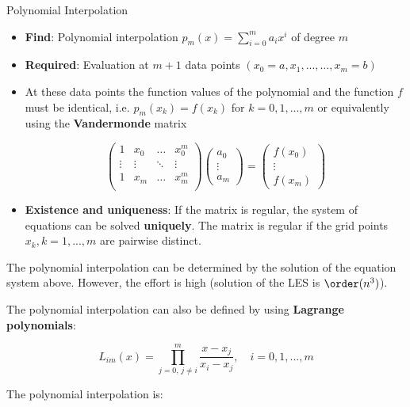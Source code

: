 \documentclass[11pt,compress,t,notes=noshow, xcolor=table]{beamer}
\begin{document}
\begin{vbframe}{Polynomial Interpolation}

\begin{itemize}
\item \textbf{Find}: Polynomial interpolation $p_m(x) = \sum_{i = 0}^m a_i x^i$ of degree $m$
\item \textbf{Required}: Evaluation at $m + 1$ data points $(x_{0} = a, x_1, ..., \ldots, x_{m} = b)$
\item At these data points the function values of the polynomial and the function $f$ must be identical, i.e. $p_m(x_k) = f(x_k)$ for $k = 0, 1, ..., m$ or equivalently using the \textbf{Vandermonde} matrix
\begin{footnotesize}
$$
\begin{pmatrix}
1 & x_0 & \hdots & x_0^m \\
\vdots & \vdots & \ddots & \vdots \\
1 & x_m & \hdots & x_m^m \\
\end{pmatrix}
\begin{pmatrix}
a_0 \\ \vdots \\ a_m
\end{pmatrix}
=
\begin{pmatrix}
f(x_0) \\ \vdots \\ f(x_m)
\end{pmatrix}
$$
\end{footnotesize}

\item \textbf{Existence and uniqueness}: If the matrix is regular, the system of equations can be solved \textbf{uniquely}. The matrix is regular if the grid points $x_k, k = 1, ..., m$ are pairwise distinct.
\end{itemize}


\framebreak

The polynomial interpolation can be determined by the solution of the equation system above. However, the effort is high (solution of the LES is $\order(n^3)$).

\lz

The polynomial interpolation can also be defined by using \textbf{Lagrange polynomials}:

$$
L_{im}(x) = \prod_{j = 0,\, j \not= i}^m \frac{x - x_{j}}{x_{i} - x_{j}}, \quad i = 0, 1, ..., m
$$

The polynomial interpolation is:


\end{vbframe}
\end{document}
